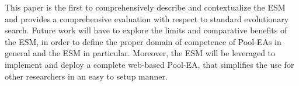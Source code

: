 This paper is the first to comprehensively describe and contextualize the ESM and provides a comprehensive evaluation with respect to standard evolutionary search.
Future work will have to explore the limits and comparative benefits of the ESM,
in order to define the proper domain of competence of Pool-EAs in general and the ESM in particular.
Moreover, the ESM will be leveraged to implement and deploy a complete web-based Pool-EA, that simplifies the use for other researchers in an easy to setup manner.





% 



